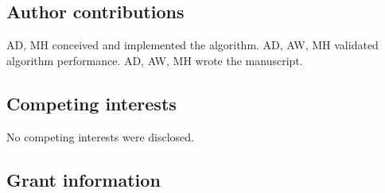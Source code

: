 


\subsection*{Author contributions}


AD, MH conceived and implemented the algorithm.
AD, AW, MH validated algorithm performance.
AD, AW, MH wrote the manuscript.

\subsection*{Competing interests}


No competing interests were disclosed.

\subsection*{Grant information}


